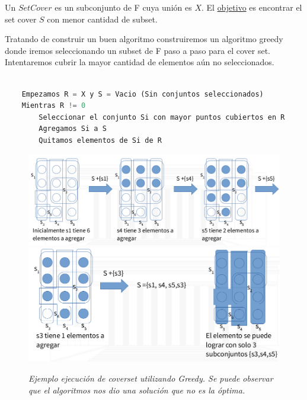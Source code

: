 \documentclass{article}
\begin{document}
Un \(Set Cover\) es un subconjunto de F cuya unión es \(X\). El \underline{objetivo} es encontrar el set cover \(S\) con menor cantidad de subset.

Tratando de construir un buen algoritmo construiremos un algoritmo greedy donde iremos seleccionando
un subset de F paso a paso para el cover set. Intentaremos cubrir la mayor cantidad de elementos aún
no seleccionados.

\begin{lstlisting}[language=Python, caption=Algoritmo de aproximación greedy]
    
    Empezamos R = X y S = Vacio (Sin conjuntos seleccionados)
    Mientras R != 0
        Seleccionar el conjunto Si con mayor puntos cubiertos en R
        Agregamos Si a S
        Quitamos elementos de Si de R

\end{lstlisting}   

\newpage
\begin{figure}[h!]
    \begin{center} 
    \includegraphics[width=\linewidth]{imagenes/ejemplo-problema-aprox-coverset1.png}
    \includegraphics[scale=0.3]{imagenes/ejemplo-problema-aprox-coverset2.png}
    \caption{\small \sl Ejemplo ejecución de coverset utilizando Greedy. Se puede observar que el algoritmos nos dio una solución que no es la óptima.} 
    \end{center}
\end{figure}
\end{document}
